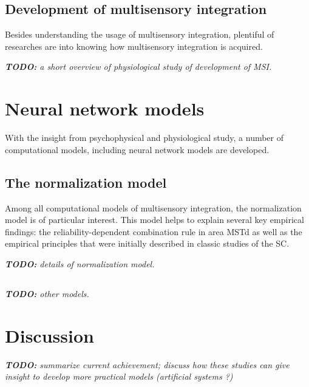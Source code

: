 \documentclass{article}[11pt]
\newcommand{\TODO}[1]{\emph{\small{{\bf TODO: } #1}}}
\begin{document}
\subsection{Development of multisensory integration}
Besides understanding the usage of multisensory integration, plentiful of researches are into knowing how multisensory integration is acquired. 

\TODO{a short overview of physiological study of development of MSI.}

\section{Neural network models}
With the insight from psychophysical and physiological study, a number of computational models, including neural network models are developed. 

\subsection{The normalization model}
Among all computational models of multisensory integration, the normalization model \cite{ohshiro_normalization_2011} is of particular interest. This model helps to explain several key empirical findings: the reliability-dependent combination rule in area MSTd as well as
the empirical principles that were initially described in classic studies of the SC.

\TODO{details of normalization model.}

\subsection{}
\TODO{other models.}

\section{Discussion}
\TODO{summarize current achievement; discuss how these studies can give insight to develop more practical models (artificial systems ?)}



\end{document}
